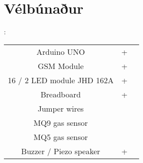\section{Vélbúnaður}
:

\begin{center}
\begin{tabular}{ |c|c|c| } 
 \hline 
 Arduino UNO & + &\\ 
 GSM Module & + & \\ 
 16 / 2 LED module JHD 162A & + & \\
 Breadboard & + & \\
 Jumper wires & & \\
 MQ9 gas sensor & & \\
 MQ5 gas sensor & & \\ 
 Buzzer / Piezo speaker & +  & \\
 \hline
\end{tabular}
\end{center}